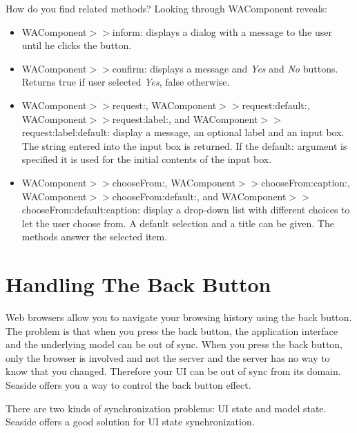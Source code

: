 \documentclass[a4paper,10pt,twoside]{book}
\newcommand{\ct}[1]{{\small\ttfamily\textup{#1}}}
\begin{document}
How do you find related methods? Looking through  \ct{WAComponent} reveals:

\begin{itemize}
\item  {} \ct{WAComponent$>$$>$inform:} displays a dialog with a message to the user until he clicks the button.
\item  {} \ct{WAComponent$>$$>$confirm:} displays a message and \textit{Yes} and \textit{No} buttons. Returns true if user selected \textit{Yes}, false otherwise.
\item  {} \ct{WAComponent$>$$>$request:},  \ct{WAComponent$>$$>$request:default:},  \ct{WAComponent$>$$>$request:label:}, and   \ct{WAComponent$>$$>$request:label:default:} display a message, an optional label and an input box. The string entered into the input box is returned. If the \ct{default:} argument is specified it is used for the initial contents of the input box.
\item  {} \ct{WAComponent$>$$>$chooseFrom:},  \ct{WAComponent$>$$>$chooseFrom:caption:},  \ct{WAComponent$>$$>$chooseFrom:default:}, and  \ct{WAComponent$>$$>$chooseFrom:default:caption:} display a drop-down list with different choices to let the user choose from. A default selection and a title can be given. The methods answer the selected item.
\end{itemize}

\section{Handling The Back Button}
\label{book:components:calling:backbutton}

Web browsers allow you to navigate your browsing history using the back button. The problem is that when you press the back button, the application interface and the underlying model can be out of sync. When you press the back button, only the browser is involved and not the server and the server has no way to know that you changed. Therefore your UI can be out of sync from its domain. Seaside offers you a way to control the back button effect.

There are two kinds of synchronization problems: UI state and model state. Seaside offers a good solution for UI state synchronization.
\end{document}
